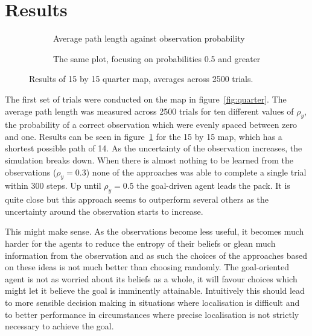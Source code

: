\documentclass{article}
\begin{document}
\section{Results}

\begin{figure}
	\centering
	\begin{subfigure}[b]{\textwidth}
		
		\caption{Average path length against observation probability}
		\label{fig:obsplot}
	\end{subfigure}
	\begin{subfigure}[b]{\textwidth}
		
		\caption{The same plot, focusing on probabilities 0.5 and greater}
		\label{fig:obsplotmag}
	\end{subfigure}
	\caption{Results of 15 by 15 quarter map, averages across 2500 trials.}
	\label{fig:obsres}
\end{figure}

The first set of trials were conducted on the map in figure~\ref{fig:quarter}. The 
average path length was measured across 2500 trials for ten different values of 
\(\rho_y\), the probability of a correct observation which were evenly spaced between
zero and one. Results can be seen in figure~\ref{fig:obsplot} for the 15 by 15 map, 
which has a shortest possible path of 14. As the uncertainty of the
observation increases, the simulation breaks down. When there is almost nothing to be
learned from the observations (\(\rho_y = 0.3\)) none of the approaches was able to 
complete a single trial within 300 steps. Up until \(\rho_y = 0.5\) the goal-driven
agent leads the pack. It is quite close but this approach seems to outperform several
others as the uncertainty around the observation starts to increase.

This might make sense. As the observations become less useful, it becomes much harder
for the agents to reduce the entropy of their beliefs or glean much information from 
the observation and as such the choices of the approaches based on these ideas is not 
much better than choosing randomly. The goal-oriented agent is not as worried about its
beliefs as a whole, it will favour choices which might let it believe the goal is 
imminently attainable. Intuitively this should lead to more sensible decision making
in situations where localisation is difficult and to better performance in circumstances
where precise localisation is not strictly necessary to achieve the goal.
\end{document}
